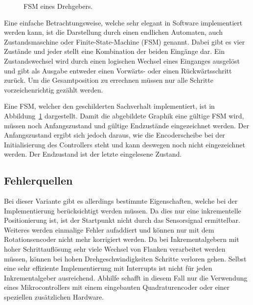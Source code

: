 \begin{figure}[!h] \centering
	\begin{minipage}[t]{.5\linewidth} \centering
		
	\end{minipage}
	\caption{FSM eines Drehgebers.}
	\label{fig:drehgeberZustaende}
\end{figure}

Eine einfache Betrachtungsweise, welche sehr elegant in Software implementiert werden kann, ist die Darstellung durch einen endlichen Automaten, auch Zustandsmaschine oder Finite-State-Machine (FSM) genannt.
Dabei gibt es vier Zustände und jeder stellt eine Kombination der beiden Eingänge dar.
Ein Zustandswechsel wird durch einen logischen Wechsel eines Einganges ausgelöst und gibt als Ausgabe entweder einen Vorwärts- oder einen Rückwärtsschritt zurück.
Um die Gesamtposition zu errechnen müssen nur alle Schritte vorzeichenrichtig gezählt werden.

Eine FSM, welcher den geschilderten Sachverhalt implementiert, ist in Abbildung~\ref{fig:drehgeberZustaende} dargestellt.
Damit die abgebildete Graphik eine gültige FSM wird, müssen noch Anfangszustand und gültige Endzustände eingezeichnet werden.
Der Anfangszustand ergibt sich jedoch daraus, wie die Encoderscheibe bei der Initialisierung des Controllers steht und kann deswegen noch nicht eingezeichnet werden.
Der Endzustand ist der letzte eingelesene Zustand. \cite[51]{book:evolvableSystems}


\subsection{Fehlerquellen}

Bei dieser Variante gibt es allerdings bestimmte Eigenschaften, welche bei der Implementierung berücksichtigt werden müssen.
Da dies nur eine inkrementelle Positionierung ist, ist der Startpunkt nicht durch das Sensorsignal ermittelbar.
Weiteres werden einmalige Fehler aufaddiert und können nur mit dem Rotationsencoder nicht mehr korrigiert werden.
Da bei Inkrementalgebern mit hoher Schrittauflösung sehr viele Wechsel von Flanken verarbeitet werden müssen, können bei hohen Drehgeschwindigkeiten Schritte verloren gehen.
Selbst eine sehr effiziente Implementierung mit Interrupts ist nicht für jeden Inkrementalgeber ausreichend.
Abhilfe schafft in diesem Fall nur die Verwendung eines Mikrocontrollers mit einem eingebauten Quadraturencoder oder einer speziellen zusätzlichen Hardware.


